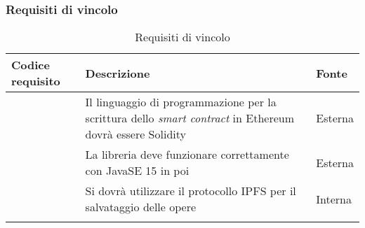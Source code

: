 \subsubsection{Requisiti di vincolo}
\begin{longtabu}{|X[0.8,c]|X[3,c]|X[0.5,c]|}

  \hline 

  \textbf{Codice requisito} & \textbf{Descrizione} & \textbf{Fonte} \\

  \hline

   \label{rvin:solidity} & Il linguaggio di programmazione per la scrittura dello \textit{smart contract} in Ethereum dovrà essere Solidity & Esterna \\ 
  
  \hline

   \label{rvin:java-version} & La libreria deve funzionare correttamente con JavaSE 15 in poi & Esterna \\
  
  \hline

   \label{rvin:ipfs} & Si dovrà utilizzare il protocollo IPFS per il salvataggio delle opere & Interna \\
  
  \hline

  \caption{Requisiti di vincolo}
\end{longtabu}
